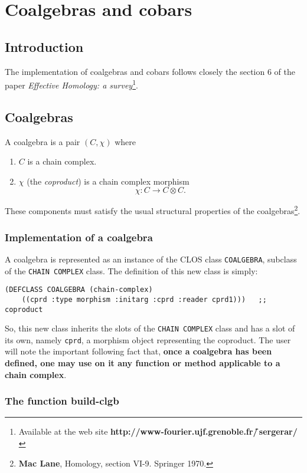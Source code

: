 \chapter{Coalgebras and cobars}

\section{Introduction}

The implementation of coalgebras and cobars follows closely the section $6$ of the paper
{\em Effective Homology: a survey}\footnote{Available
at the web site {\bf http://www-fourier.ujf.grenoble.fr/\~\,sergerar/}}.

\section{Coalgebras}

A coalgebra  is a pair $(C, \chi)$ where
\begin{enumerate}
\item $C$ is a chain complex.
\item $\chi$ (the {\em coproduct}) is a chain complex morphism 
$$\chi: C \rightarrow C \otimes C.$$
\end{enumerate}
These components must satisfy the usual structural properties of the coalgebras\footnote
{{\bf Mac Lane}, Homology, section VI-9. Springer 1970.}.

\subsection {Implementation of a coalgebra}

A coalgebra  is represented as an instance 
of the CLOS class {\tt COALGEBRA}, subclass
of the {\tt CHAIN COMPLEX} class. The definition of this new class is simply:
{\footnotesize\begin{verbatim}
(DEFCLASS COALGEBRA (chain-complex)
    ((cprd :type morphism :initarg :cprd :reader cprd1)))   ;; coproduct
\end{verbatim}}

So, this new class inherits the slots of the {\tt CHAIN COMPLEX} class and has a slot
of its own, namely {\tt cprd}, a morphism  object representing the coproduct. The user will note
the important following fact that, {\bf once a coalgebra has been defined, one may use on it any
function or method applicable to a chain complex}. 

\subsection {The function build-clgb}

